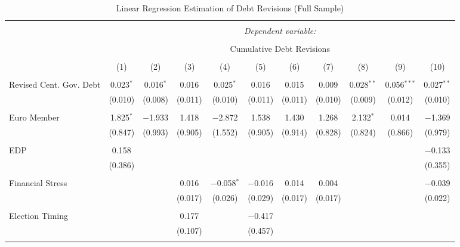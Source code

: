 
\begin{table}[!htbp] \centering 
  \caption{Linear Regression Estimation of Debt Revisions (Full Sample)} 
  \label{debt_results} 
\tiny 
\begin{tabular}{@{\extracolsep{5pt}}lcccccccccc} 
\\[-1.8ex]\hline 
\hline \\[-1.8ex] 
 & \multicolumn{10}{c}{\textit{Dependent variable:}} \\ 
\cline{2-11} 
\\[-1.8ex] & \multicolumn{10}{c}{Cumulative Debt Revisions} \\ 
\\[-1.8ex] & (1) & (2) & (3) & (4) & (5) & (6) & (7) & (8) & (9) & (10)\\ 
\hline \\[-1.8ex] 
 Revised Cent. Gov. Debt & 0.023$^{*}$ & 0.016$^{*}$ & 0.016 & 0.025$^{*}$ & 0.016 & 0.015 & 0.009 & 0.028$^{**}$ & 0.056$^{***}$ & 0.027$^{**}$ \\ 
  & (0.010) & (0.008) & (0.011) & (0.010) & (0.011) & (0.011) & (0.010) & (0.009) & (0.012) & (0.010) \\ 
  & & & & & & & & & & \\ 
 Euro Member & 1.825$^{*}$ & $-$1.933 & 1.418 & $-$2.872 & 1.538 & 1.430 & 1.268 & 2.132$^{*}$ & 0.014 & $-$1.369 \\ 
  & (0.847) & (0.993) & (0.905) & (1.552) & (0.905) & (0.914) & (0.828) & (0.824) & (0.866) & (0.979) \\ 
  & & & & & & & & & & \\ 
 EDP & 0.158 &  &  &  &  &  &  &  &  & $-$0.133 \\ 
  & (0.386) &  &  &  &  &  &  &  &  & (0.355) \\ 
  & & & & & & & & & & \\ 
 Financial Stress &  &  & 0.016 & $-$0.058$^{*}$ & $-$0.016 & 0.014 & 0.004 &  &  & $-$0.039 \\ 
  &  &  & (0.017) & (0.026) & (0.029) & (0.017) & (0.017) &  &  & (0.022) \\ 
  & & & & & & & & & & \\ 
 Election Timing &  &  & 0.177 &  & $-$0.417 &  &  &  &  &  \\ 
  &  &  & (0.107) &  & (0.457) &  &  &  &  &  \\ 
  & & & & & & & & & & \\ 

\end{tabular}
\end{table}
